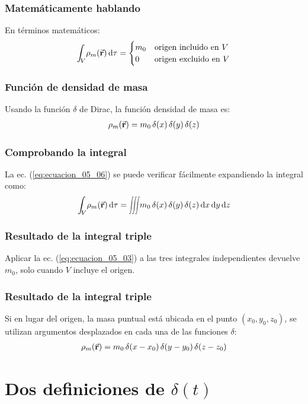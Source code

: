 \documentclass[12pt]{beamer}
\begin{document}
\begin{frame}
\frametitle{Matemáticamente hablando}
En términos matemáticos:
\pause
\begin{align}
\scaleint{5ex}_{\bs V} \rho_{m} (\va{r}) \dd{\tau} = \begin{cases}
m_{0} & \mbox{origen incluido en } V \\
0 & \mbox{origen excluido en } V
\end{cases}
\label{eq:ecuacion_05_06}
\end{align}
\end{frame}
\begin{frame}
\frametitle{Función de densidad de masa}
Usando la función $\delta$ de Dirac, la función densidad de masa es:
\pause
\begin{align}
\rho_{m} (\va{r}) = m_{0} \, \delta(x) \, \delta(y) \, \delta(z)
\label{eq:ecuacion_05_07}
\end{align}
\end{frame}
\begin{frame}
\frametitle{Comprobando la integral}
La ec. (\ref{eq:ecuacion_05_06}) se puede verificar fácilmente expandiendo la integral como:
\pause
\begin{align}
\scaleint{5ex}_{\bs V} \rho_{m} (\va{r}) \dd{\tau} = \scaleiiint{5ex} m_{0} \, \delta(x) \, \delta(y) \, \delta(z) \dd{x} \dd{y} \dd{z}
\label{eq:ecuacion_05_08}
\end{align}
\end{frame}
\begin{frame}
\frametitle{Resultado de la integral triple}
Aplicar la ec. (\ref{eq:ecuacion_05_03}) a las tres integrales independientes devuelve $m_{0}$, solo cuando $V$ incluye el origen.
\end{frame}
\begin{frame}
\frametitle{Resultado de la integral triple}
Si en lugar del origen, la masa puntual está ubicada en el punto $(x_{0}, y_{0}, z_{0})$, se utilizan argumentos desplazados en cada una de las funciones $\delta$:
\pause
\begin{align}
\rho_{m} (\va{r}) = m_{0} \, \delta (x - x_{0}) \, \delta (y - y_{0}) \, \delta (z - z_{0})
\label{eq:ecuacion_05_09}
\end{align}
\end{frame}

\section{Dos definiciones de \texorpdfstring{$\delta (t)$}{d(t)}}
\end{document}
